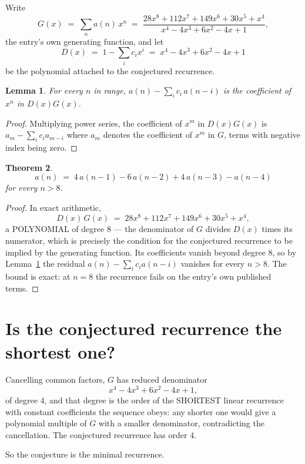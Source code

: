 \documentclass[11pt,a4paper]{article}
\theoremstyle{plain}
\newtheorem{theorem}{Theorem}
\newtheorem{lemma}[theorem]{Lemma}
\theoremstyle{definition}
\begin{document}
Write
\[
G(x)\;=\;\sum_{n}a(n)\,x^{n}\;=\;\frac{28 x^{8} + 112 x^{7} + 149 x^{6} + 30 x^{5} + x^{4}}{x^{4} - 4 x^{3} + 6 x^{2} - 4 x + 1},
\]
the entry's own generating function, and let
\[
D(x)\;=\;1-\sum_i c_i x^{i}\;=\;x^{4} - 4 x^{3} + 6 x^{2} - 4 x + 1
\]
be the polynomial attached to the conjectured recurrence.

\begin{lemma}\label{lem:key}
For every $n$ in range, $a(n)-\sum_i c_i\,a(n-i)$ is the coefficient of $x^{n}$ in
$D(x)G(x)$.
\end{lemma}

\begin{proof}
Multiplying power series, the coefficient of $x^{m}$ in $D(x)G(x)$ is
$a_m-\sum_i c_i a_{m-i}$ where $a_m$ denotes the coefficient of $x^{m}$ in $G$, terms with
negative index being zero.
\end{proof}

\begin{theorem}
\[
a(n)\;=\;4\,a(n-1) - 6\,a(n-2) + 4\,a(n-3) - a(n-4)
\]
for every $n>8$.
\end{theorem}

\begin{proof}
In exact arithmetic,
\[
D(x)\,G(x)\;=\;28 x^{8} + 112 x^{7} + 149 x^{6} + 30 x^{5} + x^{4},
\]
a POLYNOMIAL of degree $8$ --- the denominator of $G$ divides $D(x)$ times its numerator,
which is precisely the condition for the conjectured recurrence to be implied by the
generating function. Its coefficients vanish beyond degree $8$, so by
Lemma~\ref{lem:key} the residual $a(n)-\sum_ic_ia(n-i)$ vanishes for every
$n>8$. The bound is exact: at $n=8$ the recurrence fails on the entry's own published terms.
\end{proof}

\section{Is the conjectured recurrence the shortest one?}

Cancelling common factors, $G$ has reduced denominator
\[
x^{4} - 4 x^{3} + 6 x^{2} - 4 x + 1,
\]
of degree $4$, and that degree is the order of the SHORTEST linear recurrence with
constant coefficients the sequence obeys: any shorter one would give a polynomial multiple of
$G$ with a smaller denominator, contradicting the cancellation. The conjectured recurrence has
order $4$.

So the conjecture is the minimal recurrence.
\end{document}
